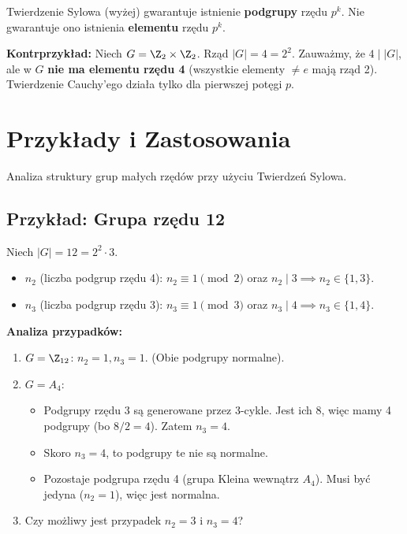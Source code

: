 \begin{remark}
    Twierdzenie Sylowa (wyżej) gwarantuje istnienie \textbf{podgrupy} rzędu $p^k$. Nie gwarantuje ono istnienia \textbf{elementu} rzędu $p^k$.
    
    \textbf{Kontrprzykład:} Niech $G = \Z_2 \times \Z_2$. Rząd $|G| = 4 = 2^2$.
    Zauważmy, że $4 \mid |G|$, ale w $G$ \textbf{nie ma elementu rzędu 4} (wszystkie elementy $\neq e$ mają rząd 2).
    Twierdzenie Cauchy'ego działa tylko dla pierwszej potęgi $p$.
\end{remark}

\section{Przykłady i Zastosowania}

Analiza struktury grup małych rzędów przy użyciu Twierdzeń Sylowa.

\subsection{Przykład: Grupa rzędu 12}
Niech $|G| = 12 = 2^2 \cdot 3$.
\begin{itemize}
    \item $n_2$ (liczba podgrup rzędu 4): $n_2 \equiv 1 \pmod 2$ oraz $n_2 \mid 3 \implies n_2 \in \{1, 3\}$.
    \item $n_3$ (liczba podgrup rzędu 3): $n_3 \equiv 1 \pmod 3$ oraz $n_3 \mid 4 \implies n_3 \in \{1, 4\}$.
\end{itemize}

\textbf{Analiza przypadków:}
\begin{enumerate}
    \item $G = \Z_{12}$: $n_2=1, n_3=1$. (Obie podgrupy normalne).
    \item $G = A_4$: 
        \begin{itemize}
            \item Podgrupy rzędu 3 są generowane przez 3-cykle. Jest ich 8, więc mamy 4 podgrupy (bo $8/2=4$). Zatem $n_3 = 4$.
            \item Skoro $n_3=4$, to podgrupy te nie są normalne.
            \item Pozostaje podgrupa rzędu 4 (grupa Kleina wewnątrz $A_4$). Musi być jedyna ($n_2=1$), więc jest normalna.
        \end{itemize}
    \item Czy możliwy jest przypadek $n_2=3$ i $n_3=4$?
\end{enumerate}

